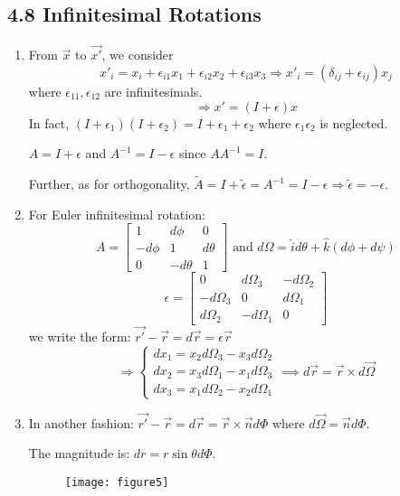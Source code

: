 \documentclass{article}
\begin{document}
	\subsection*{4.8 Infinitesimal Rotations}
	\begin{enumerate}
		\item From $\vec{x}$ to $\vec{x'}$, we consider
		\[
		x'_i = x_i + \epsilon_{i1}x_1 + \epsilon_{i2}x_2 + \epsilon_{i3}x_3 \Rightarrow x'_i = (\delta_{ij} + \epsilon_{ij})x_j
		\]
		where $\epsilon_{11}, \epsilon_{12}$ are infinitesimals.
		\[
		\Rightarrow x' = (I+\epsilon)x
		\]
		In fact, $(I+\epsilon_1)(I+\epsilon_2) = I+\epsilon_1+\epsilon_2$ where $\epsilon_1\epsilon_2$ is neglected.
		
		$A = I+\epsilon$ and $A^{-1} = I-\epsilon$ since $AA^{-1}=I$.
		
		Further, as for orthogonality, $\tilde{A} = I + \tilde{\epsilon} = A^{-1} = I-\epsilon \Rightarrow \tilde{\epsilon} = -\epsilon$.
		
		\item For Euler infinitesimal rotation:
		\[
		A = 
		\begin{bmatrix}
			1 & d\phi & 0 \\
			-d\phi & 1 & d\theta \\
			0 & -d\theta & 1
		\end{bmatrix}
		\text{ and }
		d\Omega = \hat{i}d\theta + \hat{k}(d\phi+d\psi)
		\]
		\[
		\epsilon =
		\begin{bmatrix}
			0 & d\Omega_3 & -d\Omega_2 \\
			-d\Omega_3 & 0 & d\Omega_1 \\
			d\Omega_2 & -d\Omega_1 & 0
		\end{bmatrix}
		\]
		we write the form: $\vec{r'} - \vec{r} = d\vec{r} = \epsilon\vec{r}$
		\[
		\Rightarrow
		\begin{cases}
			dx_1 = x_2 d\Omega_3 - x_3 d\Omega_2 \\
			dx_2 = x_3 d\Omega_1 - x_1 d\Omega_3 \\
			dx_3 = x_1 d\Omega_2 - x_2 d\Omega_1
		\end{cases}
		\implies d\vec{r} = \vec{r} \times d\vec{\Omega}
		\]
		
		\item In another fashion: $\vec{r'} - \vec{r} = d\vec{r} = \vec{r} \times \vec{n}d\Phi$ where $d\vec{\Omega} = \vec{n}d\Phi$.
		
		The magnitude is: $dr = r\sin\theta d\Phi$.
		
		\begin{figure}[h]
			\centering
			\texttt{[image: figure5]}
			\caption{}
			\label{fig:figure5}
		\end{figure}
		
		
	\end{enumerate}
	
\end{document}

